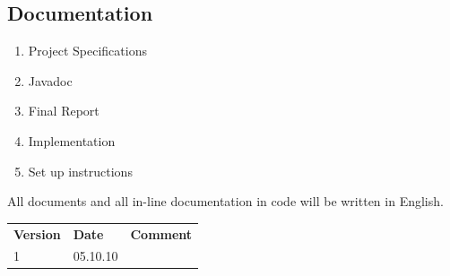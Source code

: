 \documentclass[a4paper,10pt,titlepage]{article}
\begin{document}
\subsection{Documentation}
\begin{enumerate}
 \item Project Specifications
 \item Javadoc
 \item Final Report
 \item Implementation
 \item Set up instructions
\end{enumerate}

All documents and all in-line documentation in code will be written in English.


\newpage
\begin{tabularx}{\textwidth}{XXX}
\textbf{Version} & \textbf{Date} & \textbf{Comment}\\
1 & 05.10.10 & \\
\end{tabularx}
\end{document}
